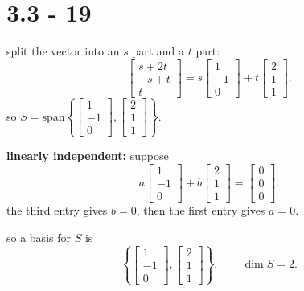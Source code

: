 \documentclass{article}
\begin{document}
\section*{3.3 - 19}

split the vector into an $s$ part and a $t$ part:
\[
\begin{bmatrix} s + 2t \\ -s + t \\ t \end{bmatrix}
= s\begin{bmatrix} 1 \\ -1 \\ 0 \end{bmatrix}
+ t\begin{bmatrix} 2 \\ 1 \\ 1 \end{bmatrix}.
\]
so $S = \mathrm{span}\left\{
\begin{bmatrix} 1 \\ -1 \\ 0 \end{bmatrix},
\begin{bmatrix} 2 \\ 1 \\ 1 \end{bmatrix}
\right\}$.

\textbf{linearly independent:} suppose
\[
a\begin{bmatrix} 1 \\ -1 \\ 0 \end{bmatrix}
+ b\begin{bmatrix} 2 \\ 1 \\ 1 \end{bmatrix}
= \begin{bmatrix} 0 \\ 0 \\ 0 \end{bmatrix}.
\]
the third entry gives $b = 0$, then the first entry gives $a = 0$.

so a basis for $S$ is
\[
\left\{
\begin{bmatrix} 1 \\ -1 \\ 0 \end{bmatrix},
\begin{bmatrix} 2 \\ 1 \\ 1 \end{bmatrix}
\right\},
\qquad
\dim S = 2.
\]
\end{document}

